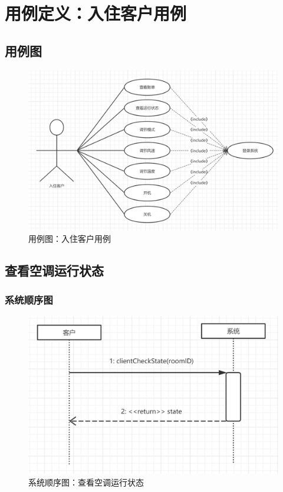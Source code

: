 \documentclass[black,normal,cn]{elegantnote}
\begin{document}
\section{用例定义：入住客户用例}

\subsection{用例图}

\begin{figure}[H]
    \centering
    \includegraphics[width=.8\textwidth]{fig/250001.png}
    \caption{用例图：入住客户用例}
    \label{fig:276001}
\end{figure}

\subsection{查看空调运行状态}

\subsubsection{系统顺序图}

\begin{figure}[H]
    \centering
    \includegraphics[width=.8\textwidth]{fig/250003.png}
    \caption{系统顺序图：查看空调运行状态}
    \label{fig:250003}
\end{figure}
\end{document}

